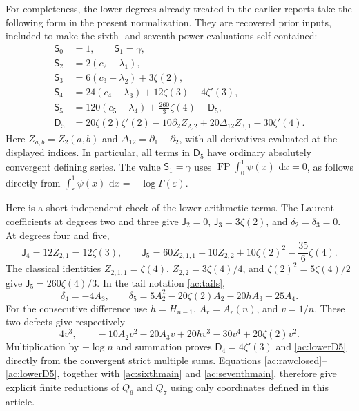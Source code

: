 \documentclass[11pt,a4paper]{article}
\numberwithin{equation}{section}
\theoremstyle{definition}
\theoremstyle{remark}
\DeclareMathOperator{\FP}{FP}
\newcommand{\dd}{\,\mathrm d}
\begin{document}
For completeness, the lower degrees already treated in the earlier
reports \cite{Higher,Fifth} take the following form in the
present normalization. They are recovered prior inputs, included to
make the sixth- and seventh-power evaluations self-contained:
\begin{align}
 \mathsf S_0&=1,\qquad \mathsf S_1=\gamma,
       \label{ac:lowerinitial}\\
 \mathsf S_2&=2(c_2-\lambda_1),\nonumber\\
 \mathsf S_3&=6(c_3-\lambda_2)+3\zeta(2),\nonumber\\
 \mathsf S_4&=24(c_4-\lambda_3)+12\zeta(3)+4\zeta'(3),\nonumber\\
 \mathsf S_5&=120(c_5-\lambda_4)+\frac{260}{3}\zeta(4)
                     +\mathsf D_5,\label{ac:lowernormalized}\\
 \mathsf D_5&=20\zeta(2)\zeta'(2)-10\partial_2Z_{2,2}
       +20\Delta_{12}Z_{3,1}-30\zeta'(4).
       \label{ac:lowerD5}
\end{align}
Here $Z_{a,b}=Z_2(a,b)$ and
$\Delta_{12}=\partial_1-\partial_2$, with all derivatives evaluated
at the displayed indices. In particular, all terms in
$\mathsf D_5$ have ordinary absolutely convergent defining series.
The value $\mathsf S_1=\gamma$ uses
$\FP\int_0^1\psi(x)\,\dd x=0$, as follows directly from
$\int_\varepsilon^1\psi(x)\,\dd x=-\log\Gamma(\varepsilon)$.

Here is a short independent check of the lower arithmetic terms.
The Laurent coefficients at degrees two and three give
$\mathsf J_2=0$, $\mathsf J_3=3\zeta(2)$, and
$\delta_2=\delta_3=0$. At degrees four and five,
\[
 \mathsf J_4=12Z_{2,1}=12\zeta(3),\qquad
 \mathsf J_5=60Z_{2,1,1}+10Z_{2,2}
                 +10\zeta(2)^2-\frac{35}{6}\zeta(4).
\]
The classical identities $Z_{2,1,1}=\zeta(4)$,
$Z_{2,2}=3\zeta(4)/4$, and
$\zeta(2)^2=5\zeta(4)/2$ give
$\mathsf J_5=260\zeta(4)/3$.
In the tail notation \eqref{ac:tails},
\[
 \delta_4=-4A_3,\qquad
 \delta_5=5A_2^2-20\zeta(2)A_2-20hA_3+25A_4.
\]
For the consecutive difference use $h=H_{n-1}$,
$A_r=A_r(n)$, and $v=1/n$. These two defects give respectively
\[
 4v^3,\qquad
 -10A_2v^2-20A_3v+20hv^3-30v^4+20\zeta(2)v^2.
\]
Multiplication by $-\log n$ and summation proves
$\mathsf D_4=4\zeta'(3)$ and \eqref{ac:lowerD5} directly from
the convergent strict multiple sums. Equations
\eqref{ac:rawclosed}--\eqref{ac:lowerD5}, together with
\eqref{ac:sixthmain} and \eqref{ac:seventhmain}, therefore give
explicit finite reductions of $Q_6$ and $Q_7$ using only coordinates
defined in this article.
\end{document}
